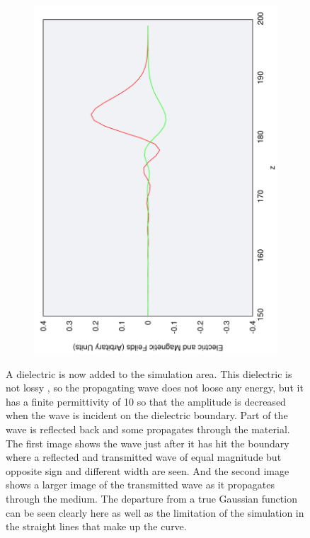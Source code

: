 \begin{figure}[ht]
\begin{subfigure}[ht]{0.45\textwidth}
                \includegraphics[angle=270, width=\textwidth]{gaussnoise1b.pdf}
        \end{subfigure}
        \caption{A dielectric is now added to the simulation area. This dielectric is not lossy , so the propagating wave does not loose any energy, but it has a finite permittivity of 10 so that the amplitude is decreased when the wave is incident on the dielectric boundary. Part of the wave is reflected back and some propagates through the material. The first image shows the wave just after it has hit the boundary where a reflected and transmitted wave of equal magnitude but opposite sign and different width are seen. And the second image shows a larger image of the transmitted wave as it propagates through the medium. The departure from a true Gaussian function can be seen clearly here as well as the limitation of the simulation in the straight lines that make up the curve.}\label{fig:dielectricgauss}
\end{figure}

